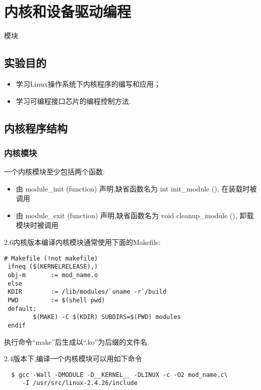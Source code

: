 \chapter{内核和设备驱动编程}{模块}

\section{实验目的}
\begin{itemize}\itemsep=-3pt
  \item 学习Linux操作系统下内核程序的编写和应用；
  \item 学习可编程接口芯片的编程控制方法.
\end{itemize}

\section{内核程序结构}
\subsection{内核模块}	
	一个内核模块至少包括两个函数:
\begin{itemize}\itemsep=-3pt
  \item 由 module\_init (function) 声明,缺省函数名为 int init\_module (),
		在装载时被调用
  \item 由 module\_exit (function) 声明,缺省函数名为 void cleanup\_module (),
		卸载模块时被调用
\end{itemize}

    2.6内核版本编译内核模块通常使用下面的Makefile:

\lstset{language=make}
\begin{lstlisting}[frame=trBL]
 # Makefile (!not makefile)
 ifneq ($(KERNELRELEASE),)
 obj-m       := mod_name.o
 else
 KDIR        := /lib/modules/`uname -r`/build
 PWD         := $(shell pwd)
 default:
        $(MAKE) -C $(KDIR) SUBDIRS=$(PWD) modules
 endif
\end{lstlisting}

执行命令``make''后生成以``.ko''为后缀的文件名.

	2.4版本下,编译一个内核模块可以用如下命令

\begin{boxedminipage}{.9\textwidth}
\begin{verbatim}
  $ gcc -Wall -DMODULE -D__KERNEL__ -DLINUX -c -O2 mod_name.c\
     -I /usr/src/linux-2.4.26/include
\end{verbatim}
\end{boxedminipage}

